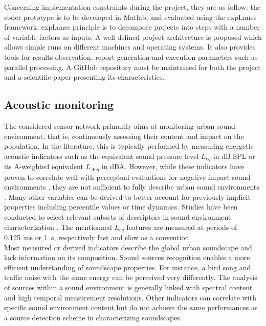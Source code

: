 \documentclass[12pt,times,onecolumn]{article}
\begin{document}
Concerning implementation constraints during the project, they are as follow: the coder prototype is to be developed in Matlab, and evaluated using the expLanes \cite{explanes} framework. expLanes principle is to decompose projects into steps with a number of variable factors as inputs. A well defined project architecture is proposed which allows simple runs on different machines and operating systems. It also provides tools for results observation, report generation and execution parameters such as parallel processing. A GitHub repository must be maintained for both the project and a scientific paper presenting its characteristics.

\subsection{Acoustic monitoring}
The considered sensor network primarily aims at monitoring urban sound environment, that is, continuously assessing their content and impact on the population. In the literature, this is typically performed by measuring energetic acoustic indicators such as the equivalent sound pressure level $L_{eq}$ in dB SPL or its A-weighted equivalent $L_{Aeq}$ in dBA. However, while these indicators have proven to correlate well with perceptual evaluations for negative impact sound environments \cite{gozalo2015}, they are not sufficient to fully describe urban sound environments \cite{rychtarikova2013}. Many other variables can be derived to better account for previously implicit properties \cite{can2016} including percentile values or time dynamics. Studies have been conducted to select relevant subsets of descriptors in sound environment characterization \cite{can2015, brocolini2013, nilsson2007}. The mentionned $L_{eq}$ features are measured at periods of 0.125~ms or 1~s, respectively fast and slow as a convention.\\

Most measured or derived indicators describe the global urban soundscape and lack information on its composition. Sound sources recognition enables a more efficient understanding of soundscape properties. For instance, a bird song and traffic noise with the same energy can be perceived very differently. The analysis of sources within a sound environment is generally linked with spectral content \cite{ishiyama2000} and high temporal measurement resolutions. Other indicators can correlate with specific sound environment content \cite{aumond2017} but do not achieve the same performances as a source detection scheme in characterizing soundscapes.\\
\end{document}
